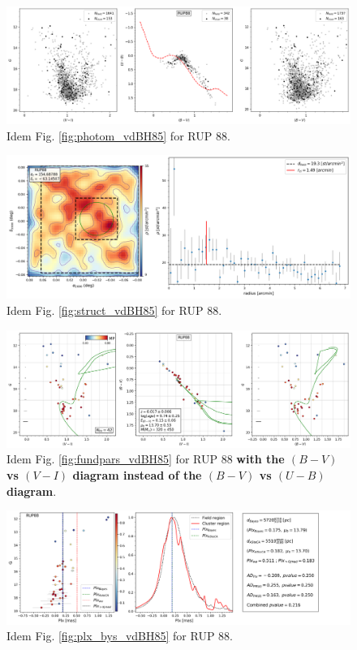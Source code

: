 \documentclass[referee]{aa}
\begin{document}
\begin{figure}[ht]
    \centering
    \includegraphics[width=\hsize]{../figs/obs_RUP88.png}
    \caption{Idem Fig. \ref{fig:photom_vdBH85} for RUP 88.}
    \label{fig31}
\end{figure}
\begin{figure}[ht]
    \centering
    \includegraphics[width=\hsize]{../figs/dmap_rup88.png}
    \caption{Idem Fig. \ref{fig:struct_vdBH85} for RUP 88.}
    \label{fig32}
\end{figure}
\begin{figure}[ht]
    \centering
    \includegraphics[width=\hsize]{../figs/cmds_rup88.png}
    \caption{Idem Fig. \ref{fig:fundpars_vdBH85} for RUP 88
\textbf{with the $(B-V)$ vs $(V-I)$ diagram instead of the $(B-V)$ vs $(U-B)$
diagram}.}
    \label{fig33}
\end{figure}
\begin{figure}[ht]
    \centering
    \includegraphics[width=\hsize]{../figs/plx_RUP88.png}
    \caption{Idem Fig. \ref{fig:plx_bys_vdBH85} for RUP 88.}
    \label{fig34}
\end{figure}
\end{document}
